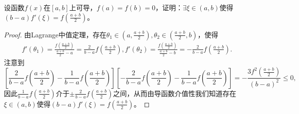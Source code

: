 \documentclass[../../main.tex]{subfiles}%
\begin{document}
\begin{example}
设函数$f(x)$在$[a,b]$上可导，$f(a)=f(b)=0$，证明：$\exists \xi \in (a,b)$使得$(b - a)f'(\xi)=f\left(\frac{a + b}{2}\right)$。
\end{example}
\begin{proof}

由Lagrange中值定理，存在$ \theta_1 \in \left( a,\frac{a+b}{2} \right) ,\theta_2 \in \left( \frac{a+b}{2},b \right) $，使得
\begin{align*}
f'(\theta_1)=\frac{f\left( \frac{a+b}{2} \right)}{\frac{a+b}{2}-a}=\frac{2}{b-a}f\left( \frac{a+b}{2} \right) , f'(\theta_2)=\frac{f\left( \frac{a+b}{2} \right)}{\frac{a+b}{2}-b}=-\frac{2}{b-a}f\left( \frac{a+b}{2} \right) .
\end{align*}
注意到
$$\left[\frac{2}{b - a}f\left(\frac{a + b}{2}\right)-\frac{1}{b - a}f\left(\frac{a + b}{2}\right)\right]\left[-\frac{2}{b - a}f\left(\frac{a + b}{2}\right)-\frac{1}{b - a}f\left(\frac{a + b}{2}\right)\right]=-\frac{3f^2\left(\frac{a + b}{2}\right)}{(b - a)^2}\leqslant 0,$$
因此$\frac{1}{b - a}f\left(\frac{a + b}{2}\right)$介于$\pm \frac{2}{b - a}f\left(\frac{a + b}{2}\right)$之间，从而由导函数介值性我们知道存在$\xi \in (a,b)$使得$(b - a)f'(\xi)=f\left(\frac{a + b}{2}\right)$。

\end{proof}
\end{document}
